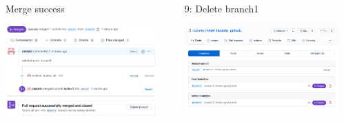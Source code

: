 \begin{frame}{ }
\begin{columns}
\begin{column}{0.49\textwidth}
\begin{exampleblock}{Merge success}
    \begin{center}
    \includegraphics[height=3.5cm]{05_history/Images/FAIR_github_MergeSucceed.png}
    \end{center}
\end{exampleblock}
\end{column}
\begin{column}{0.49\textwidth}
\begin{exampleblock}{9: Delete branch1}
    \begin{center}
    \includegraphics[height=3.4cm]{05_history/Images/FAIR_github_DeleteBranch1.png}
    \end{center}
\end{exampleblock}
\end{column}
\end{columns}
\end{frame}